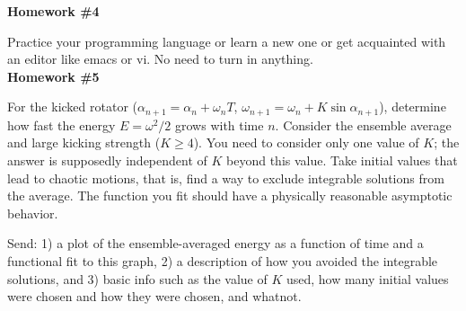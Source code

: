 \documentclass[12pt]{article}
\begin{document}



{\bf Homework \#4}

Practice your programming language or learn a new one or get acquainted with an editor like emacs or vi. No need to turn in anything.\\


{\bf Homework \#5}

For the kicked rotator ($\alpha_{n+1}=\alpha_n+\omega_n T$, $\omega_{n+1}=\omega_n + K\sin\alpha_{n+1}$), determine how fast the energy $E=\omega^2/2$ grows with time $n$.  
Consider the ensemble average and large kicking strength ($K \geq 4$). You need to consider only one value of $K$; the answer is supposedly independent of $K$ beyond this value.
Take initial values that lead to chaotic motions, that is, find a way to exclude integrable solutions from the average.
The function you fit should have a physically reasonable asymptotic behavior.


Send:  1) a plot of the ensemble-averaged energy as a function of time and a functional fit to this graph, 
2) a description of how you avoided the integrable solutions, and 
3) basic info such as the value of $K$ used, how many initial values were chosen and how they were chosen, and whatnot.\\

\end{document}
